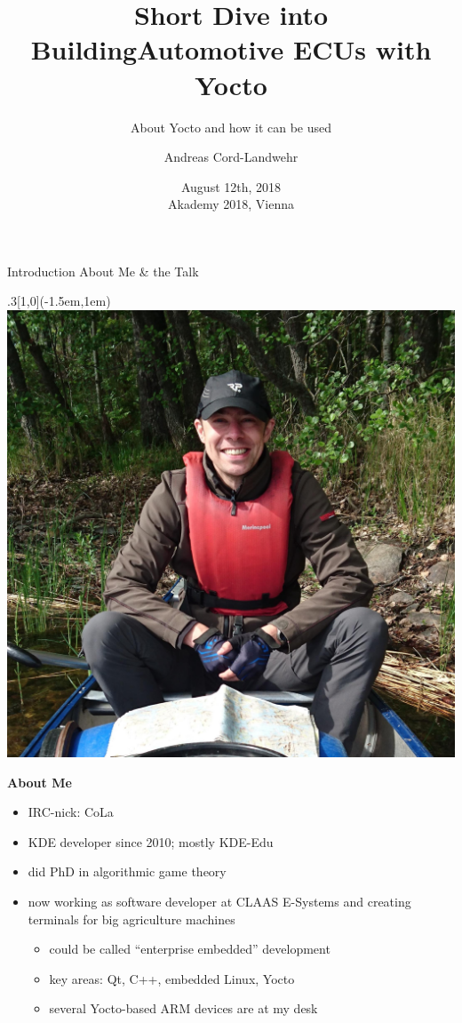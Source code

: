 \documentclass[ucs,9pt]{beamer}
\title[Automotive ECUs with Yocto]{Short Dive into Building\newline Automotive ECUs with Yocto}
\subtitle{About Yocto and how it can be used}
\author{Andreas Cord-Landwehr}
\date{\textnormal{August 12th, 2018\\[\medskipamount] Akademy 2018, Vienna}}
\begin{document}
\maketitle

\begin{frame}
    {Introduction}
    {About Me \& the Talk}

    \begin{textblock*}{.3\paperwidth}[1,0](\paperwidth-1.5em,1em)%
        \includegraphics[width=\linewidth]{images/me}
    \end{textblock*}%

    \textbf{About Me}
    \begin{itemize}
        \item IRC-nick: CoLa
        \item KDE developer since 2010; mostly KDE-Edu
        \item did PhD in algorithmic game theory
        \item now working as software developer at\newline
            CLAAS E-Systems and creating terminals for big agriculture machines
        \begin{itemize}
            \item could be called ``enterprise embedded'' development
            \item key areas: Qt, C++, embedded Linux, Yocto
            \item several Yocto-based ARM devices are at my desk
        \end{itemize}
    \end{itemize}
    \bigskip


\end{frame}
\end{document}
